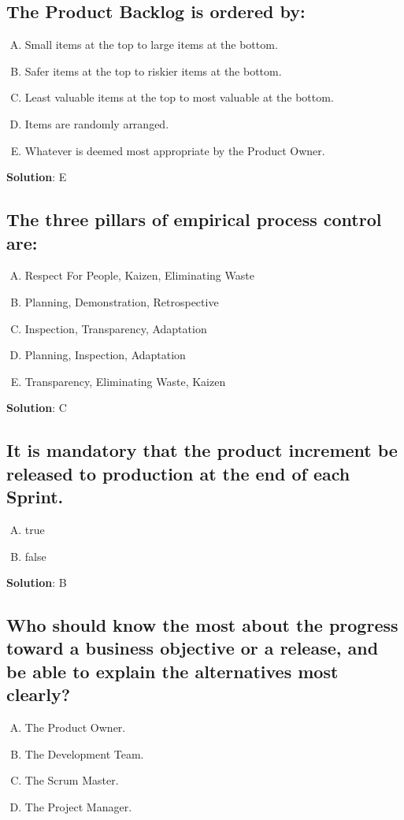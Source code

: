 \subsection{The Product Backlog is ordered by:}
\begin{enumerate}[A)]
  \item Small items at the top to large items at the bottom.
  \item Safer items at the top to riskier items at the bottom.
  \item Least valuable items at the top to most valuable at the bottom.
  \item Items are randomly arranged.
  \item Whatever is deemed most appropriate by the Product Owner.
\end{enumerate}


\textbf{Solution}: E


\subsection{The three pillars of empirical process control are:}
\begin{enumerate}[A)]
  \item Respect For People, Kaizen, Eliminating Waste
  \item Planning, Demonstration, Retrospective
  \item Inspection, Transparency, Adaptation
  \item Planning, Inspection, Adaptation
  \item Transparency, Eliminating Waste, Kaizen
\end{enumerate}


\textbf{Solution}: C


\subsection{It is mandatory that the product increment be released to production at the end of each Sprint.}
\begin{enumerate}[A)]
  \item true
  \item false
\end{enumerate}


\textbf{Solution}: B


\subsection{Who should know the most about the progress toward a business objective or a
  release, and be able to explain the alternatives most clearly?}
\begin{enumerate}[A)]
  \item The Product Owner.
  \item The Development Team.
  \item The Scrum Master.
  \item The Project Manager.
\end{enumerate}


